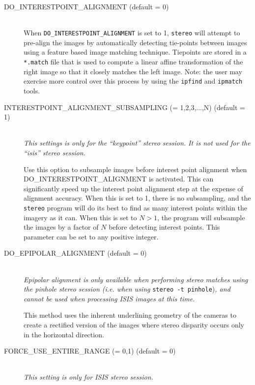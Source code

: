 \begin{description}
\item[DO\_INTERESTPOINT\_ALIGNMENT \textnormal (default = 0)] \hfill \\
  When \texttt{DO\_INTERESTPOINT\_ALIGNMENT} is set to 1,
  \texttt{stereo} will attempt to pre-align the images by
  automatically detecting tie-points between images using a feature
  based image matching technique. Tiepoints are stored in a
  \texttt{*.match} file that is used to compute a linear affine
  transformation of the right image so that it closely matches the
  left image.  Note: the user may exercise more control over this
  process by using the \texttt{ipfind} and \texttt{ipmatch} tools.

\item[INTERESTPOINT\_ALIGNMENT\_SUBSAMPLING \textnormal{\small{(= 1,2,3,...,N)}} (default = 1)]\hfill \\
  {\em This settings is only for the ``keypoint'' stereo session.  It
    is not used for the ``isis'' stereo session.}

  Use this option to subsample images before interest point alignment
  when \\ DO\_INTERESTPOINT\_ALIGNMENT is activated.  This can
  significantly speed up the interest point alignment step at the
  expense of alignment accuracy.  When this is set to 1, there is no
  subsampling, and the \texttt{stereo} program will do its best to
  find as many interest points within the imagery as it can.  When
  this is set to $N > 1$, the program will subsample the images by a
  factor of $N$ before detecting interest points.  This parameter can
  be set to any positive integer.

\item[DO\_EPIPOLAR\_ALIGNMENT \textnormal (default = 0)] \hfill \\
  {\em Epipolar alignment is only available when performing stereo
    matches using the pinhole stereo session (i.e. when using}
    \texttt{stereo -t pinhole}){\em, and cannot be used when processing
    ISIS images at this time.}

  This method uses the inherent underlining geometry of the cameras to
  create a rectified version of the images where stereo disparity
  occurs only in the horizontal direction.

\item[FORCE\_USE\_ENTIRE\_RANGE \textnormal{\small{(= 0,1)}} (default = 0)] \hfill \\
  \emph{This setting is only for ISIS stereo session.}


\end{description}
